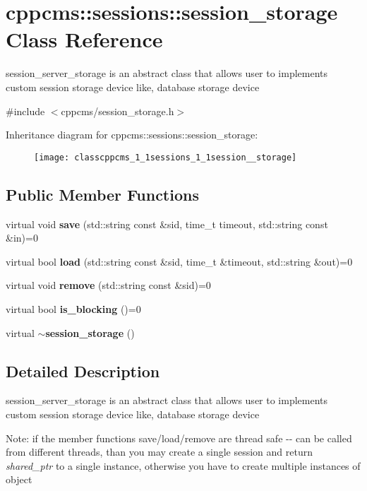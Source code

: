 \section{cppcms\-:\-:sessions\-:\-:session\-\_\-storage \-Class \-Reference}
\label{classcppcms_1_1sessions_1_1session__storage}


session\-\_\-server\-\_\-storage is an abstract class that allows user to implements custom session storage device like, database storage device  




{\ttfamily \#include $<$cppcms/session\-\_\-storage.\-h$>$}

\-Inheritance diagram for cppcms\-:\-:sessions\-:\-:session\-\_\-storage\-:\begin{figure}[H]
\begin{center}
\leavevmode
\texttt{[image: classcppcms\_1\_1sessions\_1\_1session\_\_storage]}
\end{center}
\end{figure}
\subsection*{\-Public \-Member \-Functions}
\begin{DoxyCompactItemize}
\item 
virtual void {\bf save} (std\-::string const \&sid, time\-\_\-t timeout, std\-::string const \&in)=0
\item 
virtual bool {\bf load} (std\-::string const \&sid, time\-\_\-t \&timeout, std\-::string \&out)=0
\item 
virtual void {\bf remove} (std\-::string const \&sid)=0
\item 
virtual bool {\bf is\-\_\-blocking} ()=0
\item 
virtual {\bf $\sim$session\-\_\-storage} ()
\end{DoxyCompactItemize}


\subsection{\-Detailed \-Description}
session\-\_\-server\-\_\-storage is an abstract class that allows user to implements custom session storage device like, database storage device 

\-Note\-: if the member functions save/load/remove are thread safe -\/-\/ can be called from different threads, than you may create a single session and return {\itshape shared\-\_\-ptr\/} to a single instance, otherwise you have to create multiple instances of object 

